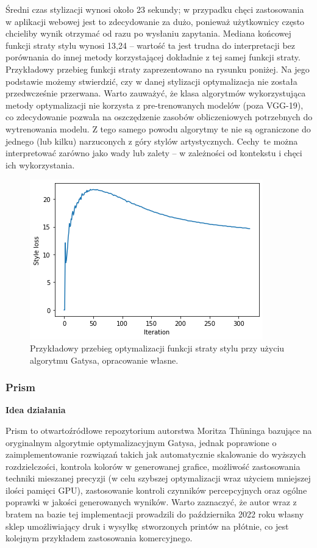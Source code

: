 \documentclass[12pt]{article}
\begin{document}
Średni czas stylizacji wynosi około 23 sekundy; w przypadku chęci zastosowania w aplikacji webowej jest to zdecydowanie za dużo, ponieważ użytkownicy często chcieliby wynik otrzymać od razu po wysłaniu zapytania. Mediana końcowej funkcji straty stylu wynosi 13,24 – wartość ta jest trudna do interpretacji bez porównania do innej metody korzystającej dokładnie z tej samej funkcji straty. Przykładowy przebieg funkcji straty zaprezentowano na rysunku poniżej. Na jego podstawie możemy stwierdzić, czy w danej stylizacji optymalizacja nie została przedwcześnie przerwana. Warto zauważyć, że klasa algorytmów wykorzystująca metody optymalizacji nie korzysta z pre-trenowanych modelów (poza VGG-19), co zdecydowanie pozwala na oszczędzenie zasobów obliczeniowych potrzebnych do wytrenowania modelu. Z tego samego powodu algorytmy te nie są ograniczone do jednego (lub kilku) narzuconych z góry stylów artystycznych. Cechy te można interpretować zarówno jako wady lub zalety – w zależności od kontekstu i chęci ich wykorzystania.

\begin{figure}[H]
    \centering
    \includegraphics[scale=0.75, trim = 0mm 0mm 0mm 0mm, clip]{u15.png}
    \caption{Przykładowy przebieg optymalizacji funkcji straty stylu przy użyciu algorytmu Gatysa, opracowanie własne.}
    \label{fig:11}
\end{figure}

\subsubsection{Prism}

\noindent\textbf{Idea działania}

Prism to otwartoźródłowe repozytorium autorstwa Moritza Thüninga bazujące na oryginalnym algorytmie optymalizacyjnym Gatysa, jednak poprawione o zaimplementowanie rozwiązań takich jak automatycznie skalowanie do wyższych rozdzielczości, kontrola kolorów w generowanej grafice, możliwość zastosowania techniki mieszanej precyzji (w celu szybszej optymalizacji wraz użyciem mniejszej ilości pamięci GPU), zastosowanie kontroli czynników percepcyjnych oraz ogólne poprawki w jakości generowanych wyników. Warto zaznaczyć, że autor wraz z bratem na bazie tej implementacji prowadzili do października 2022 roku własny sklep umożliwiający druk i wysyłkę stworzonych printów na płótnie, co jest kolejnym przykładem zastosowania komercyjnego.
\end{document}

